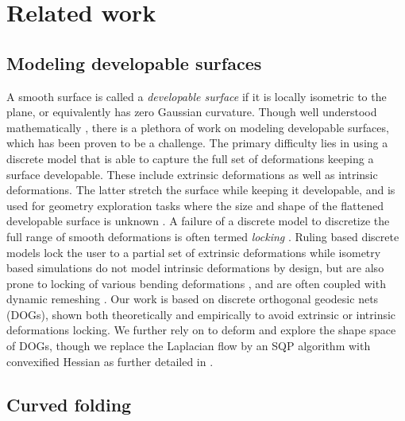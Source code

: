 \section{Related work}
\subsection{Modeling developable surfaces}
A smooth surface is called a \textit{developable surface} if it is locally isometric to the plane, or equivalently has zero Gaussian curvature. Though well understood mathematically \cite{do_carmo,spivak,computational_line}, there is a plethora of work on modeling developable surfaces, which has been proven to be a challenge. The primary difficulty lies in using a discrete model that is able to capture the full set of deformations keeping a surface developable. These include extrinsic deformations as well as intrinsic deformations. The latter stretch the surface while keeping it developable, and is used for geometry exploration tasks where the size and shape of the flattened developable surface is unknown \cite{conical,pottmann_new,rabi2018shape}. A failure of a discrete model to discretize the full range of smooth deformations is often termed \textit{locking} \cite{solomon,locking1}. Ruling based discrete models \cite{conical,curved_folding_kilian,pottmann_new,stein_dev} lock the user to a partial set of extrinsic deformations while isometry based simulations \cite{grin_shells,shells, goldenthal2007efficient,froh_botsch} do not model intrinsic deformations by design, but are also prone to locking of various bending deformations \cite{locking1,locking2}, and are often coupled with dynamic remeshing \cite{narain2012adaptive,StringActuated:2017,Narain,SchreckEG2017}.  Our work is based on discrete orthogonal geodesic nets \cite{rabi18} (DOGs), shown both theoretically and empirically to avoid extrinsic or intrinsic deformations locking. We further rely on \cite{rabi2018shape} to deform and explore the shape space of DOGs, though we replace the Laplacian flow by an SQP algorithm with convexified Hessian as further detailed in .
\subsection{Curved folding}

